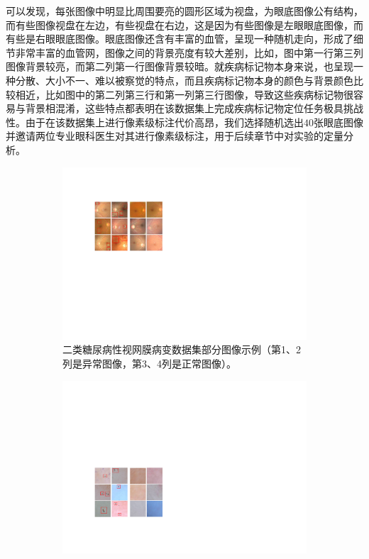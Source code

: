 可以发现，每张图像中明显比周围要亮的圆形区域为视盘，为眼底图像公有结构，而有些图像视盘在左边，有些视盘在右边，这是因为有些图像是左眼眼底图像，而有些是右眼眼底图像。眼底图像还含有丰富的血管，呈现一种随机走向，形成了细节非常丰富的血管网，图像之间的背景亮度有较大差别，比如，图中第一行第三列图像背景较亮，而第二列第一行图像背景较暗。就疾病标记物本身来说，也呈现一种分散、大小不一、难以被察觉的特点，而且疾病标记物本身的颜色与背景颜色比较相近，比如图中的第二列第三行和第一列第三行图像，导致这些疾病标记物很容易与背景相混淆，这些特点都表明在该数据集上完成疾病标记物定位任务极具挑战性。由于在该数据集上进行像素级标注代价高昂，我们选择随机选出$40$张眼底图像并邀请两位专业眼科医生对其进行像素级标注，用于后续章节中对实验的定量分析。

\begin{figure}[h!]
	\centering
	\begin{subfigure}{0.48\textwidth}
		\centering
		\includegraphics[width=1\textwidth]{figure/bin_dr_ds_example}
		\caption{二类糖尿病性视网膜病变数据集部分图像示例（第1、2列是异常图像，第3、4列是正常图像）。}
		\label{subfig:bin_dr_ds_example}
	\end{subfigure}
	\quad
	\begin{subfigure}{0.48\textwidth}
		\centering
		\includegraphics[width=1\textwidth]{figure/bin_simulate_skin_example}

\end{subfigure}
\end{figure}
